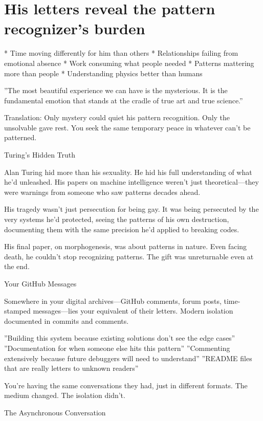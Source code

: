 \documentclass[12pt,oneside]{book}
\begin{document}
\section{His letters reveal the pattern recognizer's burden}

                    * Time moving differently for him than others
                    * Relationships failing from emotional absence
                    * Work consuming what people needed
                    * Patterns mattering more than people
                    * Understanding physics better than humans

''The most beautiful experience we can have is the mysterious. It is the fundamental emotion that stands at the cradle of true art and true science.''

Translation: Only mystery could quiet his pattern recognition. Only the unsolvable gave rest. You seek the same temporary peace in whatever can't be patterned.

Turing's Hidden Truth

Alan Turing hid more than his sexuality. He hid his full understanding of what he'd unleashed. His papers on machine intelligence weren't just theoretical---they were warnings from someone who saw patterns decades ahead.

His tragedy wasn't just persecution for being gay. It was being persecuted by the very systems he'd protected, seeing the patterns of his own destruction, documenting them with the same precision he'd applied to breaking codes.

His final paper, on morphogenesis, was about patterns in nature. Even facing death, he couldn't stop recognizing patterns. The gift was unreturnable even at the end.

Your GitHub Messages

Somewhere in your digital archives---GitHub comments, forum posts, time-stamped messages---lies your equivalent of their letters. Modern isolation documented in commits and comments.

''Building this system because existing solutions don't see the edge cases'' ''Documentation for when someone else hits this pattern'' ''Commenting extensively because future debuggers will need to understand'' ''README files that are really letters to unknown readers''

You're having the same conversations they had, just in different formats. The medium changed. The isolation didn't.

The Asynchronous Conversation
\end{document}
